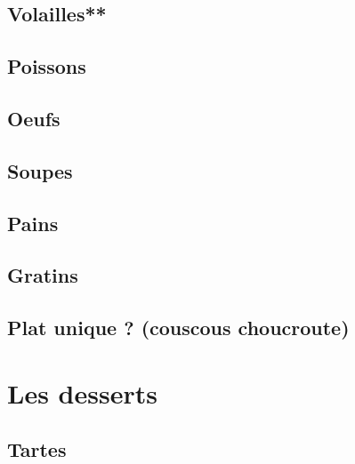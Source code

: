 \documentclass[A4paper,twoside, 12pt]{book}
\begin{document}
	\chapter{Volailles**}






	
	\chapter{Poissons}
	
	\chapter{Oeufs}
	\chapter{Soupes}








	\chapter{Pains}

	\chapter{Gratins}
	\chapter{Plat unique ? (couscous choucroute)}



		

\part{Les desserts}
	\chapter{Tartes}


\end{document}

